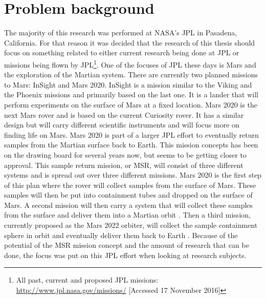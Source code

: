 \chapter{Problem background}

\label{ch:problembackground}
The majority of this research was performed at NASA's \ac{JPL} in Pasadena, California. For that reason it was decided that the research of this thesis should focus on something related to either current research being done at \ac{JPL} or missions being flown by \ac{JPL}\footnote{All past, current and proposed \ac{JPL} missions: \url{http://www.jpl.nasa.gov/missions/} [Accessed 17 November 2016]}.   One of the focuses of \ac{JPL} these days is Mars and the exploration of the Martian system. There are currently two planned missions to Mars: InSight and Mars 2020. InSight is a mission similar to the Viking and the Phoenix missions and primarily based on the last one. It is a lander that will perform experiments on the surface of Mars at a fixed location. Mars 2020 is the next Mars rover and is based on the current Curiosity rover. It has a similar design but will carry different scientific instruments and will focus more on finding life on Mars. Mars 2020 is part of a larger \ac{JPL} effort to eventually return samples from the Martian surface back to Earth. This mission concepts has been on the drawing board for several years now, but seems to be getting closer to approval. This sample return mission, or \ac{MSR}, will consist of three different systems and is spread out over three different missions. Mars 2020 is the first step of this plan where the rover will collect samples from the surface of Mars. These samples will then be put into containment tubes and dropped on the surface of Mars. A second mission will then carry a system that will collect these samples from the surface and deliver them into a Martian orbit \citep{shotwell2016drivers}. Then a third mission, currently proposed as the Mars 2022 orbiter, will collect the sample containment sphere in orbit and eventually deliver them back to Earth \citep{woolley2011mars}. Because of the potential of the \ac{MSR} mission concept and the amount of research that can be done, the focus was put on this \ac{JPL} effort when looking at research subjects.




